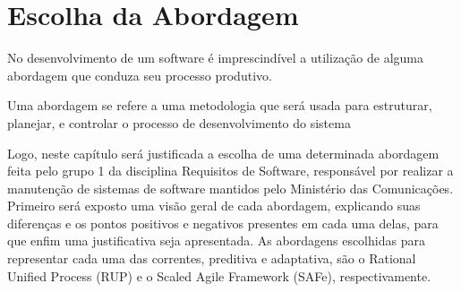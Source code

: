 \chapter[Escolha da Abordagem]{Escolha da Abordagem}
No desenvolvimento de um software é imprescindível a utilização de alguma abordagem que conduza seu processo produtivo.

Uma abordagem se refere a uma metodologia que será usada para estruturar, planejar, e controlar o processo de desenvolvimento do sistema\cite{CMS001}

Logo, neste capítulo será justificada a escolha de uma determinada abordagem feita pelo grupo 1 da disciplina Requisitos de Software, responsável por realizar a manutenção de sistemas de software mantidos pelo Ministério das Comunicações. Primeiro será exposto uma visão geral de cada abordagem, explicando suas diferenças e os pontos positivos e negativos presentes em cada uma delas, para que enfim uma justificativa seja apresentada. As abordagens escolhidas para representar cada uma das correntes, preditiva e adaptativa, são o Rational Unified Process (RUP) e o Scaled Agile Framework (SAFe), respectivamente.

